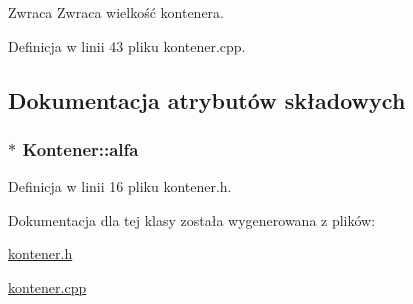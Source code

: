 \begin{DoxyReturn}{Zwraca}
Zwraca wielkość kontenera. 
\end{DoxyReturn}


Definicja w linii 43 pliku kontener.\-cpp.



\subsection{Dokumentacja atrybutów składowych}
\hypertarget{class_kontener_aba3ad5cbdc83aa04b18b4237f6a16371}{
\subsubsection[{alfa}]{$\ast$ Kontener\-::alfa\hspace{0.3cm}{\ttfamily [protected]}}}\label{class_kontener_aba3ad5cbdc83aa04b18b4237f6a16371}


Definicja w linii 16 pliku kontener.\-h.



Dokumentacja dla tej klasy została wygenerowana z plików\-:\begin{DoxyCompactItemize}
\item 
\hyperlink{kontener_8h}{kontener.\-h}\item 
\hyperlink{kontener_8cpp}{kontener.\-cpp}\end{DoxyCompactItemize}
